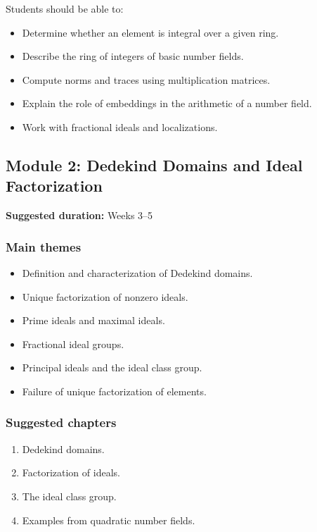 \documentclass[11pt]{article}
\begin{document}
Students should be able to:

\begin{itemize}
    \item Determine whether an element is integral over a given ring.
    \item Describe the ring of integers of basic number fields.
    \item Compute norms and traces using multiplication matrices.
    \item Explain the role of embeddings in the arithmetic of a number field.
    \item Work with fractional ideals and localizations.
\end{itemize}

\subsection{Module 2: Dedekind Domains and Ideal Factorization}

\textbf{Suggested duration:} Weeks 3--5

\subsubsection*{Main themes}

\begin{itemize}
    \item Definition and characterization of Dedekind domains.
    \item Unique factorization of nonzero ideals.
    \item Prime ideals and maximal ideals.
    \item Fractional ideal groups.
    \item Principal ideals and the ideal class group.
    \item Failure of unique factorization of elements.
\end{itemize}

\subsubsection*{Suggested chapters}

\begin{enumerate}
    \item Dedekind domains.
    \item Factorization of ideals.
    \item The ideal class group.
    \item Examples from quadratic number fields.
\end{enumerate}
\end{document}
